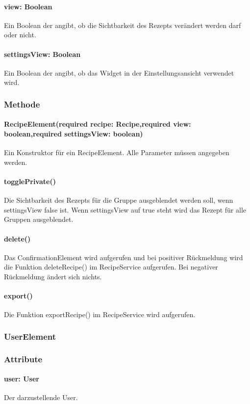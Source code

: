 \documentclass[parskip=full]{scrartcl}
\begin{document}
\paragraph*{view: Boolean} Ein Boolean der angibt, ob die Sichtbarkeit des Rezepts verändert werden darf oder nicht.
\paragraph*{settingsView: Boolean} Ein Boolean der angibt, ob das Widget in der Einstellungsansicht verwendet wird.

\subsubsection*{Methode}
\paragraph*{RecipeElement(required recipe: Recipe,required view: boolean,required settingsView: boolean)} Ein Konstruktor für ein RecipeElement. Alle Parameter müssen angegeben werden.
\paragraph*{togglePrivate()} Die Sichtbarkeit des Rezepts für die Gruppe ausgeblendet werden soll, wenn settingsView false ist. Wenn settingsView auf true steht wird das Rezept für alle Gruppen ausgeblendet.
\paragraph*{delete()} Das ConfirmationElement wird aufgerufen und bei positiver Rückmeldung wird die Funktion deleteRecipe() im RecipeService aufgerufen. Bei negativer Rückmeldung ändert sich nichts.
\paragraph*{export()} Die Funktion exportRecipe() im RecipeService wird aufgerufen.

\subsubsection{UserElement}
\subsubsection*{Attribute}

\paragraph*{user: User} Der darzustellende User.
\end{document}
